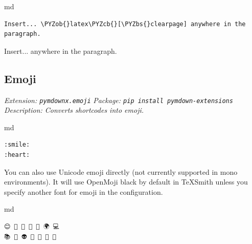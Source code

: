 \documentclass[a4paper,twoside]{article}
\begin{document}
\begin{code}{md}{}{}
\begin{Verbatim}[commandchars=\\\{\},breaklines, breakanywhere, commandchars=\\\{\}]
Insert... \PYZob{}latex\PYZcb{}[\PYZbs{}clearpage] anywhere in the paragraph.
\end{Verbatim}
\end{code}
Insert... \clearpage anywhere in the paragraph.

\subsection{Emoji}\label{emoji}

\emph{Extension: \texttt{pymdownx.emoji}}
\emph{Package: \texttt{pip install pymdown-\allowbreak{}extensions}}
\emph{Description: Converts shortcodes into emoji.}

\begin{code}{md}{}{}
\begin{Verbatim}[commandchars=\\\{\},breaklines, breakanywhere, commandchars=\\\{\}]
:smile:
:heart:
\end{Verbatim}
\end{code}
\begin{displayquote}


\end{displayquote}
You can also use Unicode emoji directly (not currently supported in mono environments). It will use OpenMoji black by default in TeXSmith unless you specify another font for emoji in the configuration.

\begin{code}{md}{}{}
\begin{Verbatim}[commandchars=\\\{\},breaklines, breakanywhere, commandchars=\\\{\}]
😊 🚀 🍕 🎉 🐍 🌍 💻
📚 🎨 👽 👋 🤖 🦄 🧠
\end{Verbatim}
\end{code}
\begin{displayquote}

      
      

\end{displayquote}
\end{document}
